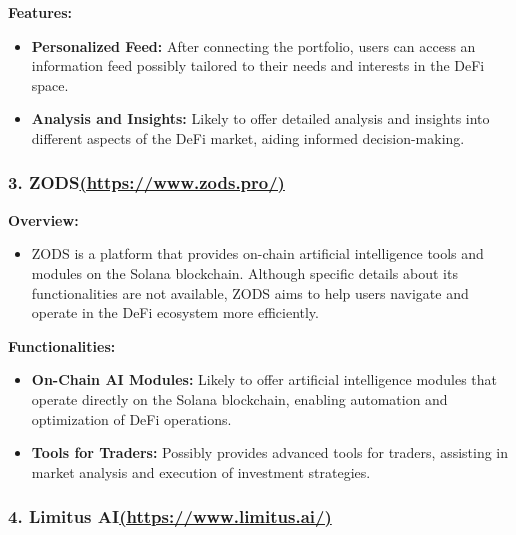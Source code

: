 \documentclass[
]{article}
\providecommand{\tightlist}{%
  \setlength{\itemsep}{0pt}\setlength{\parskip}{0pt}}
\begin{document}
\textbf{Features:}

\begin{itemize}
\tightlist
\item
  \textbf{Personalized Feed:} After connecting the portfolio, users can
  access an information feed possibly tailored to their needs and
  interests in the DeFi space.
\item
  \textbf{Analysis and Insights:} Likely to offer detailed analysis and
  insights into different aspects of the DeFi market, aiding informed
  decision-making.
\end{itemize}

\hypertarget{zodshttpswww.zods.pro}{%
\subsubsection{\texorpdfstring{3.
ZODS\href{https://www.zods.pro/}{(https://www.zods.pro/)}}{3. ZODS(https://www.zods.pro/)}}\label{zodshttpswww.zods.pro}}

\textbf{Overview:}

\begin{itemize}
\tightlist
\item
  ZODS is a platform that provides on-chain artificial intelligence
  tools and modules on the Solana blockchain. Although specific details
  about its functionalities are not available, ZODS aims to help users
  navigate and operate in the DeFi ecosystem more efficiently.
\end{itemize}

\textbf{Functionalities:}

\begin{itemize}
\tightlist
\item
  \textbf{On-Chain AI Modules:} Likely to offer artificial intelligence
  modules that operate directly on the Solana blockchain, enabling
  automation and optimization of DeFi operations.
\item
  \textbf{Tools for Traders:} Possibly provides advanced tools for
  traders, assisting in market analysis and execution of investment
  strategies.
\end{itemize}

\hypertarget{limitus-aihttpswww.limitus.ai}{%
\subsubsection{\texorpdfstring{4. Limitus
AI\href{https://www.limitus.ai/}{(https://www.limitus.ai/)}}{4. Limitus AI(https://www.limitus.ai/)}}\label{limitus-aihttpswww.limitus.ai}}
\end{document}
